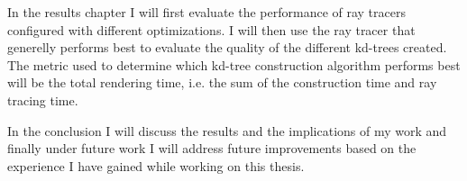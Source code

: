 
In the results chapter I will first evaluate the performance of ray tracers
configured with different optimizations. I will then use the ray tracer that
generelly performs best to evaluate the quality of the different kd-trees
created. The metric used to determine which kd-tree construction algorithm
performs best will be the total rendering time, i.e. the sum of the construction
time and ray tracing time.


In the conclusion I will discuss the results and the implications of my work and
finally under future work I will address future improvements based on the
experience I have gained while working on this thesis.

